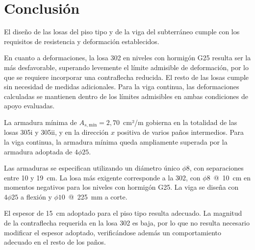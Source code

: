 \section{Conclusión}

El diseño de las losas del piso tipo y de la viga del subterráneo cumple con los requisitos de resistencia y deformación establecidos.

En cuanto a deformaciones, la losa 302 en niveles con hormigón G25 resulta ser la más desfavorable, superando levemente el límite admisible de deformación, por lo que se requiere incorporar una contraflecha reducida. El resto de las losas cumple sin necesidad de medidas adicionales. Para la viga continua, las deformaciones calculadas se mantienen dentro de los límites admisibles en ambas condiciones de apoyo evaluadas.

La armadura mínima de $A_{s,\text{mín}} = 2{,}70$~cm²/m gobierna en la totalidad de las losas 305i y 305ii, y en la dirección $x$ positiva de varios paños intermedios. Para la viga continua, la armadura mínima queda ampliamente superada por la armadura adoptada de $4\phi25$.

Las armaduras se especifican utilizando un diámetro único $\phi$8, con separaciones entre 10 y 19~cm. La losa más exigente corresponde a la 302, con $\phi$8~@~10~cm en momentos negativos para los niveles con hormigón G25. La viga se diseña con $4\phi25$ a flexión y $\phi10$~@~225~mm a corte.

El espesor de 15~cm adoptado para el piso tipo resulta adecuado. La magnitud de la contraflecha requerida en la losa 302 es baja, por lo que no resulta necesario modificar el espesor adoptado, verificándose además un comportamiento adecuado en el resto de los paños.